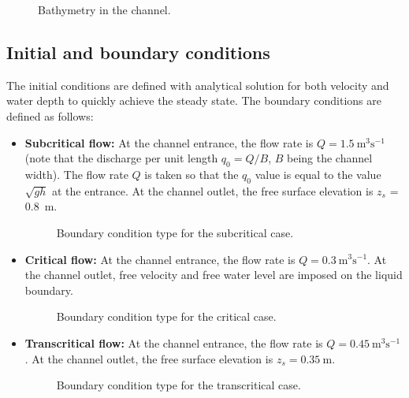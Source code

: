 \begin{figure}[H]
 \centering
 \caption{Bathymetry in the channel.}
 \label{t2d:bumpsub:fig:baty}
\end{figure}

\subsection{Initial and boundary conditions}
The initial conditions are defined with analytical solution for both velocity and water depth to quickly achieve the steady state.
The boundary conditions are defined as follows:
\begin{itemize}
\item {\bf Subcritical flow:}
At the channel entrance, the flow rate is $Q =  1.5~\text{m}^3\text{s}^{-1}$
(note that the discharge per unit length $q_0=Q/B$, $B$ being the channel width).
The flow rate $Q$ is taken so that the $q_0$ value is equal to the value
$\sqrt{gh}$ at the entrance.
At the channel outlet, the free surface elevation is $z_s$ = 0.8~m.

\begin{figure}[!htbp]
 \centering
 \caption{Boundary condition type for the subcritical case.}
 \label{t2d:bumpsub:fig:bc}
\end{figure}

\item {\bf Critical flow:}
At the channel entrance, the flow rate is $Q = 0.3~\text{m}^3\text{s}^{-1}$.
At the channel outlet, free velocity and free water level are imposed on the liquid boundary.

\begin{figure}[!htbp]
 \centering
 \caption{Boundary condition type for the critical case.}
 \label{t2d:bumpcri:fig:bc}
\end{figure}

\item {\bf Transcritical flow:}
At the channel entrance, the flow rate is $Q = 0.45~\text{m}^3\text{s}^{-1}$.
At the channel outlet, the free surface elevation is $z_{s} = 0.35~\text{m}$.

\begin{figure}[!htbp]
 \centering
 \caption{Boundary condition type for the transcritical case.}
 \label{t2d:bumptrans:fig:bc}
\end{figure}

\end{itemize}

